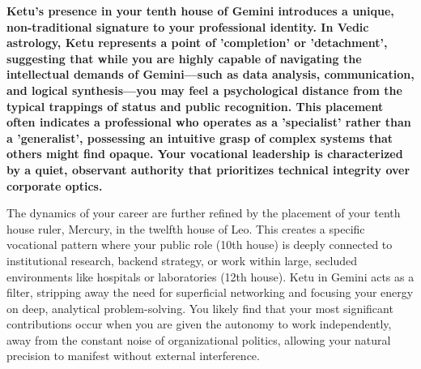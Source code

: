 
\label{topic12}

{\fontsize{9.5}{13.8}\selectfont\bfseries\color{DeepSlate} Ketu's presence in your tenth house of Gemini introduces a unique, non-traditional signature to your professional identity. In Vedic astrology, Ketu represents a point of 'completion' or 'detachment', suggesting that while you are highly capable of navigating the intellectual demands of Gemini---such as data analysis, communication, and logical synthesis---you may feel a psychological distance from the typical trappings of status and public recognition. This placement often indicates a professional who operates as a 'specialist' rather than a 'generalist', possessing an intuitive grasp of complex systems that others might find opaque. Your vocational leadership is characterized by a quiet, observant authority that prioritizes technical integrity over corporate optics.}\par\vspace{2mm}

{\fontsize{9}{13}\selectfont The dynamics of your career are further refined by the placement of your tenth house ruler, Mercury, in the twelfth house of Leo. This creates a specific vocational pattern where your public role (10th house) is deeply connected to institutional research, backend strategy, or work within large, secluded environments like hospitals or laboratories (12th house). Ketu in Gemini acts as a filter, stripping away the need for superficial networking and focusing your energy on deep, analytical problem-solving. You likely find that your most significant contributions occur when you are given the autonomy to work independently, away from the constant noise of organizational politics, allowing your natural precision to manifest without external interference.}\par\vspace{1.8mm}

